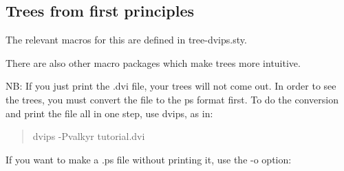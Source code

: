 \subsection{Trees from first principles}

The relevant macros for this are defined in tree-dvips.sty.



There are also other macro packages which make trees more
intuitive.

NB:  If you just print the .dvi file, your trees will not come
out.  In order to see the trees, you must convert the file to
the ps format first.  To do the conversion and print the file
all in one step, use dvips, as in:

\begin{quote}
dvips -Pvalkyr tutorial.dvi
\end{quote}

\noindent
If you want to make a .ps file without printing it, use the -o
option:

